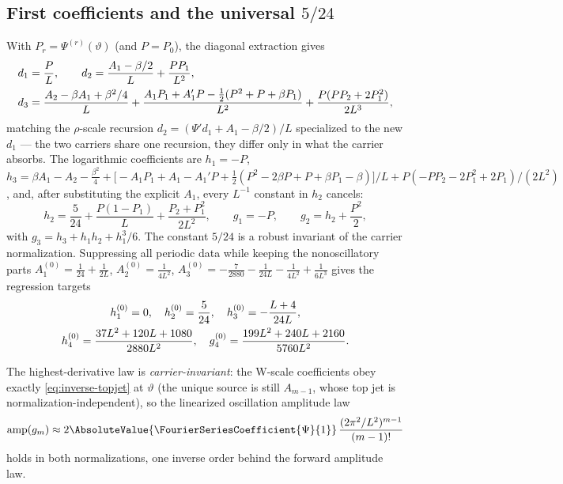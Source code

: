 \documentclass[11pt,oneside]{article}
\numberwithin{equation}{section}
\theoremstyle{definition}
\theoremstyle{remark}
\begin{document}
\subsection{First coefficients and the universal $5/24$}

With $P_r=\Psi^{(r)}(\vartheta)$ (and $P=P_0$), the diagonal
extraction gives
\begin{align}
 d_1&=\frac PL,
 \qquad
 d_2=\frac{A_1-\beta/2}{L}+\frac{PP_1}{L^{2}},
 \notag\\
 d_3&=\frac{A_2-\beta A_1+\beta^{2}/4}{L}
 +\frac{A_1P_1+A_1'P-\tfrac12(P^{2}+P+\beta P_1)}{L^{2}}
 +\frac{P(PP_2+2P_1^{2})}{2L^{3}},
 \label{eq:W-d123}
\end{align}
matching the $\rho$-scale recursion
$d_2=(\Psi'd_1+A_1-\beta/2)/L$ specialized to the new
$d_1$ --- the two carriers share one recursion, they differ only in
what the carrier absorbs.  The logarithmic coefficients are
$h_1=-P$,
$h_3=\beta A_1-A_2-\tfrac{\beta^{2}}4
+\bigl[-A_1P_1+A_1-A_1'P
+\tfrac12(P^{2}-2\beta P+P+\beta P_1-\beta)\bigr]/L
+P(-PP_2-2P_1^{2}+2P_1)/(2L^{2})$, and, after substituting the
explicit $A_1$, every $L^{-1}$ constant in $h_2$ cancels:
\begin{equation}
 \boxed{\;
 h_2=\frac5{24}
 +\frac{P(1-P_1)}{L}
 +\frac{P_2+P_1^{2}}{2L^{2}},
 \qquad
 g_1=-P,
 \qquad
 g_2=h_2+\frac{P^{2}}2,
 \;}
 \label{eq:524}
\end{equation}
with $g_3=h_3+h_1h_2+h_1^{3}/6$.  The constant $5/24$ is a robust
invariant of the carrier normalization.  Suppressing all periodic
data while keeping the nonoscillatory parts
$A_1^{(0)}=\tfrac1{24}+\tfrac1{2L}$,
$A_2^{(0)}=\tfrac1{4L^{2}}$,
$A_3^{(0)}=-\tfrac7{2880}-\tfrac1{24L}-\tfrac1{4L^{2}}+\tfrac1{6L^{3}}$
gives the regression targets
\begin{gather}
 h_1^{(0)}=0,\quad
 h_2^{(0)}=\frac5{24},\quad
 h_3^{(0)}=-\frac{L+4}{24L},
 \notag\\
 h_4^{(0)}=\frac{37L^{2}+120L+1080}{2880L^{2}},\quad
 g_4^{(0)}=\frac{199L^{2}+240L+2160}{5760L^{2}}.
 \label{eq:zero-periodic}
\end{gather}

The highest-derivative law is \emph{carrier-invariant}: the W-scale
coefficients obey exactly
\eqref{eq:inverse-topjet} at $\vartheta$ (the unique source is still
$A_{m-1}$, whose top jet is normalization-independent), so the
linearized oscillation amplitude law
\begin{equation}
 \operatorname{amp}(g_m)\approx
 2\AbsoluteValue{\FourierSeriesCoefficient{\Psi}{1}}\,
 \frac{(2\pi^{2}/L^{2})^{m-1}}{(m-1)!}
 \label{eq:amplitude-law}
\end{equation}
holds in both normalizations, one inverse order behind the forward
amplitude law.
\end{document}
